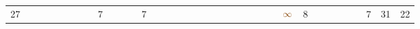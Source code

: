 \begin{landscape}
\begin{table}
\begin{adjustwidth}{-2.6cm}{}
{\begin{tabular}{l|lllllllllllllllllllllllllllllllll|ll}
		27   &            &                                                                 &                                                                 &                                                                 &                                                                 &                                                                 &                                                                 & 7                                                               &                                                                 &                                                                 &                                                                 & 7                                                               &                                                                 &                                                                 &                                                                 &                                                                 &                                                                 &                                                                 &                                                                 &                                                                 &                                                                 &                                                                 &                                                                 &                                                                 &                                                                 & $\textcolor[rgb]{0.541,0.29,0.043}{\infty}$ & 8                                                               &                                                                 &                                                                 &                                                                 &                                                                 &                                                                 & 7                                                               & 31         & 22          \\

\end{tabular}}
\end{adjustwidth}
\end{table}
\end{landscape}
